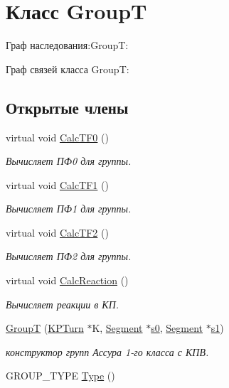 \hypertarget{class_group_t}{
\section{Класс GroupT}
\label{class_group_t}
}


Граф наследования:GroupT:


Граф связей класса GroupT:
\subsection*{Открытые члены}
\begin{DoxyCompactItemize}
\item 
virtual void \hyperlink{class_group_t_a82eac24b629b793d3714333980da7ab6}{CalcTF0} ()
\begin{DoxyCompactList}\small\item\em Вычисляет ПФ0 для группы. \item\end{DoxyCompactList}\item 
virtual void \hyperlink{class_group_t_a5baed33fe3d4959f281b52dbc807e792}{CalcTF1} ()
\begin{DoxyCompactList}\small\item\em Вычисляет ПФ1 для группы. \item\end{DoxyCompactList}\item 
virtual void \hyperlink{class_group_t_a76fe8b08f12586e6218920d03e85aa91}{CalcTF2} ()
\begin{DoxyCompactList}\small\item\em Вычисляет ПФ2 для группы. \item\end{DoxyCompactList}\item 
virtual void \hyperlink{class_group_t_a3f133aa40421c31e618c72b9b215b291}{CalcReaction} ()
\begin{DoxyCompactList}\small\item\em Вычисляет реакции в КП. \item\end{DoxyCompactList}\item 
\hyperlink{class_group_t_a6cb2ea09b3f2b09b6f8a2a5f3da6c286}{GroupT} (\hyperlink{class_k_p_turn}{KPTurn} $\ast$K, \hyperlink{class_segment}{Segment} $\ast$\hyperlink{class_group1_a769c658c59d6045b6af2a6ba1d920660}{s0}, \hyperlink{class_segment}{Segment} $\ast$\hyperlink{class_group1_acf0f92405ee52288a65b0ec48d523c74}{s1})
\begin{DoxyCompactList}\small\item\em конструктор групп Ассура 1-\/го класса с КПВ. \item\end{DoxyCompactList}\item 
GROUP\_\-TYPE \hyperlink{class_group_t_a3ca588ef54c4fa87f769f4d679bff8ef}{Type} ()
\end{DoxyCompactItemize}
